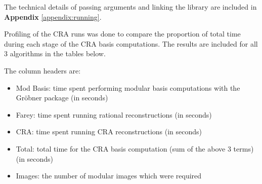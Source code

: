 \documentclass[letterpaper,12pt,titlepage,oneside,final]{book}
\begin{document}
The technical details of passing arguments and linking the library are included in \textbf{Appendix} \ref{appendix:running}.  

Profiling of the CRA runs was done to compare the proportion of total time during each stage of the CRA basis computations.  The results are included for all 3 algorithms in the tables below.  

The column headers are:
\begin{itemize}
  \item Mod Basis: time spent performing modular basis computations with the Gr\"obner package (in seconds)
  \item Farey: time spent running rational reconstructions (in seconds)
  \item CRA: time spent running CRA reconstructions (in seconds)
  \item Total: total time for the CRA basis computation (sum of the above 3 terms) (in seconds)
  \item Images: the number of modular images which were required
\end{itemize} 
\end{document}

